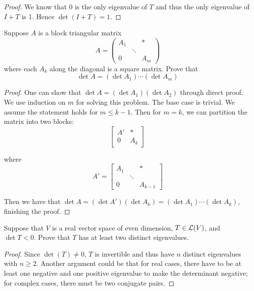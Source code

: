 \documentclass{extarticle}
\begin{document}
\begin{proof}
We know that 0 is the only eigenvalue of \(T\) and thus the only eigenvalue of \(I + T\) is 1. Hence 
\(\det (I+T) = 1\).
\end{proof}

\begin{problem}{5}
    Suppose \(A\) is a block triangular matrix 
    \[A = \begin{pmatrix}
        A_1 & & * \\ 
           & \ddots & \\ 
        0 & & A_m
    \end{pmatrix}\]
    where each \(A_k\) along the diagonal is a square matrix. Prove that 
    \[\det A = (\det A_1) \cdots (\det A_m)\]
\end{problem}

\begin{proof}
One can show that \(\det A = (\det A_1) (\det A_2)\) through direct proof. We use induction on \(m\) for 
solving this problem. The base case is trivial. We assume the statement holds for \(m \leq k-1\). Then 
for \(m = k\), we can partition the matrix into two blocks: 
\[\begin{bmatrix}
    A' & * \\ 
    0 & A_k 
\end{bmatrix}\]

where 
\[A' = \begin{bmatrix}
    A_1 & & * \\ 
    & \ddots & \\ 
    0 & & A_{k-1}
\end{bmatrix}\]

Then we have that \(\det A = (\det A') (\det A_k) = (\det A_1) \cdots (\det A_k)\), finishing the proof. 
\end{proof}

\begin{problem}{9}
    Suppose that \(V\) is a real vector space of even dimension, \(T \in \mathcal{L}(V)\), and \(\det T < 0\). 
    Prove that \(T\) has at least two distinct eigenvalues. 
\end{problem}

\begin{proof}
Since \(\det (T) \neq 0\), \(T\) is invertible and thus have \(n\) distinct eigenvalues with 
\(n \geq 2\). Another argument could be that for real cases, there have to be at least one negative and 
one positive eigenvalue to make the determinant negative; for complex cases, there must be 
two conjugate pairs. 
\end{proof}
\end{document}
